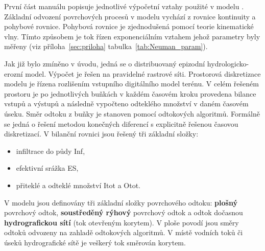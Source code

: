 %

První část manuálu popisuje jednotlivé výpočetní vztahy použité v modelu \smod. Základní odvození povrchových procesů v modelu \smod vychází z rovnice kontinuity a pohybové rovnice. Pohybová rovnice je zjednodušená pomocí teorie kinematické vlny. Tímto způsobem je tok řízen exponenciálním vztahem jehož parametry byly měřeny (viz  příloha~\ref{sec:priloha} tabulka~\ref{tab:Neuman_param}). 

Jak již bylo zmíněno v úvodu, jedná se o distribuovaný epizodní hydrologicko-erozní model. Výpočet je řešen na pravidelné rastrové síti. Prostorová diskretizace modelu je řízena  rozlišením vstupního digitálního model terénu. V celém řešeném prostoru je po jednotlivých buňkách v každém časovém kroku provedena bilance vstupů a výstupů a následně vypočteno odteklého množství v daném časovém úseku. Směr odtoku z buňky je stanoven pomocí odtokových algoritmů. Formálně se jedná o řešení metodou konečných diferencí s explicitně řešenou časovou diskretizací. V bilanční rovnici jsou řešený tři základní složky:


\begin{itemize}\itemsep 0cm
\item infiltrace do půdy \acs{Inf},
\item efektivní srážka \acs{ES},
\item přiteklé a odteklé množství \acs{Itot} a \acs{Otot}.
\end{itemize}


V modelu jsou definovány tři základní složky povrchového odtoku: \textbf{plošný} povrchový odtok, \textbf{soustředěný rýhový}  povrchový odtok a odtok dočasnou \textbf{hydrografickou sítí} (tok otevřeným korytem). V ploše povodí jsou směry odtoků odvozeny na zahladě odtokových algoritmů. V místě vodních toků či úseků hydrografické sítě je veškerý tok směrován korytem.



\newpage



